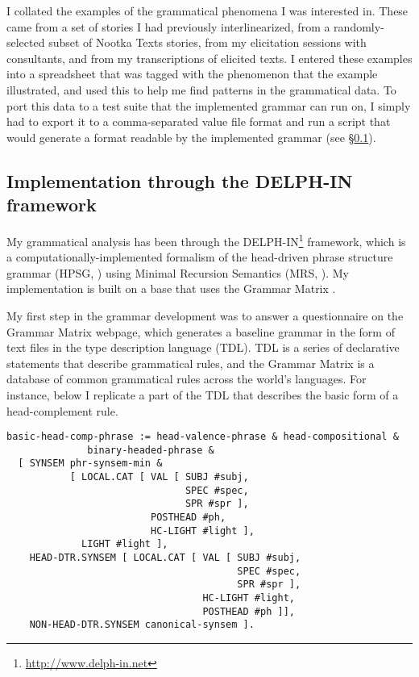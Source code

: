 I collated the examples of the grammatical phenomena I was interested in. These came from a set of stories I had previously interlinearized, from a randomly-selected subset of Nootka Texts stories, from my elicitation sessions with consultants, and from my transcriptions of elicited texts. I entered these examples into a spreadsheet that was tagged with the phenomenon that the example illustrated, and used this to help me find patterns in the grammatical data. To port this data to a test suite that the implemented grammar can run on, I simply had to export it to a comma-separated value file format and run a script that would generate a format readable by the implemented grammar (see \S\ref{sec:method:delphin}).

\subsection{Implementation through the DELPH-IN framework} \label{sec:method:delphin}

My grammatical analysis has been through the DELPH-IN\footnote{\url{http://www.delph-in.net}} framework, which is a computationally-implemented formalism of the head-driven phrase structure grammar (HPSG, \citealt{pollardsag1994}) using Minimal Recursion Semantics (MRS, \citealt{copestake2005}). My implementation is built on a base that uses the Grammar Matrix \citep{bender2002, benderetal2010}.

My first step in the grammar development was to answer a questionnaire on the Grammar Matrix webpage, which generates a baseline grammar in the form of text files in the type description language (TDL). TDL is a series of declarative statements that describe grammatical rules, and the Grammar Matrix is a database of common grammatical rules across the world's languages. For instance, below I replicate a part of the TDL that describes the basic form of a head-complement rule.

\begin{verbatim}
basic-head-comp-phrase := head-valence-phrase & head-compositional &
              binary-headed-phrase &
  [ SYNSEM phr-synsem-min &
           [ LOCAL.CAT [ VAL [ SUBJ #subj,
                               SPEC #spec,
                               SPR #spr ],
                         POSTHEAD #ph,
                         HC-LIGHT #light ],
             LIGHT #light ],
    HEAD-DTR.SYNSEM [ LOCAL.CAT [ VAL [ SUBJ #subj,
                                        SPEC #spec,
                                        SPR #spr ],
                                  HC-LIGHT #light,
                                  POSTHEAD #ph ]],
    NON-HEAD-DTR.SYNSEM canonical-synsem ].
\end{verbatim}

